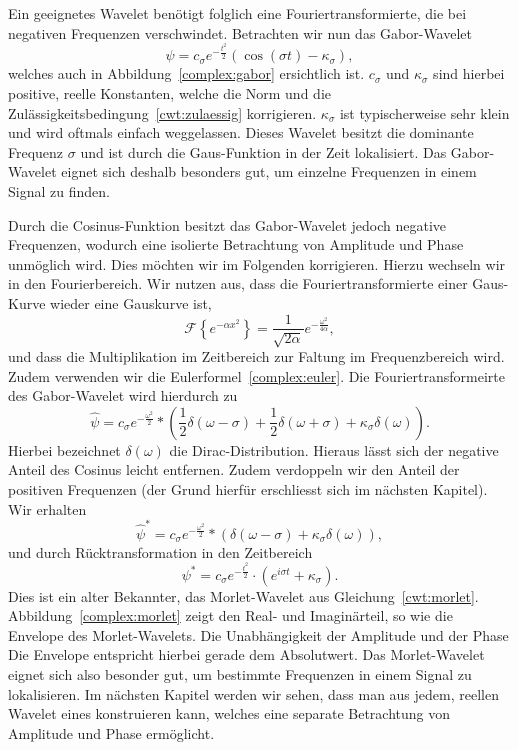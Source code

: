 Ein geeignetes Wavelet benötigt folglich eine Fouriertransformierte, die bei negativen Frequenzen verschwindet.
Betrachten wir nun das Gabor-Wavelet
\[
	\psi = c_\sigma e^{-\frac{t^2}{2}}\left(\cos\left(\sigma t\right) - \kappa_\sigma\right),
\]
welches auch in Abbildung~\ref{complex:gabor} ersichtlich ist.
$c_\sigma$ und $\kappa_\sigma$ sind hierbei positive, reelle Konstanten, welche die Norm und die Zulässigkeitsbedingung~\eqref{cwt:zulaessig} korrigieren.
$\kappa_\sigma$ ist typischerweise sehr klein und wird oftmals einfach weggelassen.
Dieses Wavelet besitzt die dominante Frequenz $\sigma$ und ist durch die Gaus-Funktion in der Zeit lokalisiert.
Das Gabor-Wavelet eignet sich deshalb besonders gut, um einzelne Frequenzen in einem Signal zu finden.

Durch die Cosinus-Funktion besitzt das Gabor-Wavelet jedoch negative Frequenzen, wodurch eine isolierte Betrachtung von Amplitude und Phase unmöglich wird.
Dies möchten wir im Folgenden korrigieren.
Hierzu wechseln wir in den Fourierbereich.
Wir nutzen aus, dass die Fouriertransformierte einer Gaus-Kurve wieder eine Gauskurve ist,
\[
	\mathcal{F}\left\lbrace e^{-\alpha x^2} \right\rbrace 
	= \frac{1}{\sqrt{2\alpha}}e^{- \frac{\omega^2}{4\alpha}},
\]
und dass die Multiplikation im Zeitbereich zur Faltung im Frequenzbereich wird.
Zudem verwenden wir die Eulerformel~\eqref{complex:euler}.
Die Fouriertransformeirte des Gabor-Wavelet wird hierdurch zu
\[
 \hat{\psi} = 
 c_\sigma e^{- \frac{\omega^2}{2}} * \left(
  \frac{1}{2}\delta(\omega - \sigma) +
  \frac{1}{2}\delta(\omega + \sigma) + 
  \kappa_\sigma\delta(\omega)
  \right).
\]
Hierbei bezeichnet $\delta(\omega)$ die Dirac-Distribution.
Hieraus lässt sich der negative Anteil des Cosinus leicht entfernen.
Zudem verdoppeln wir den Anteil der positiven Frequenzen (der Grund hierfür erschliesst sich im nächsten Kapitel).
Wir erhalten
\[
	\hat{\psi}^\ast = 
	c_\sigma e^{- \frac{\omega^2}{2}} * \left(
	\delta(\omega - \sigma) +
	\kappa_\sigma\delta(\omega)
	\right),
\]
und durch Rücktransformation in den Zeitbereich
\[
	\psi^\ast = 
	c_\sigma e^{- \frac{t^2}{2}} \cdot \left(
	e^{i\sigma t} +
	\kappa_\sigma
	\right).
\]
Dies ist ein alter Bekannter, das Morlet-Wavelet aus Gleichung~\eqref{cwt:morlet}.
Abbildung~\ref{complex:morlet} zeigt den Real- und Imaginärteil, so wie die Envelope des Morlet-Wavelets.
Die Unabhängigkeit der Amplitude und der Phase 
Die Envelope entspricht hierbei gerade dem Absolutwert.
Das Morlet-Wavelet eignet sich also besonder gut, um bestimmte Frequenzen in einem Signal zu lokalisieren.
Im nächsten Kapitel werden wir sehen, dass man aus jedem, reellen Wavelet eines konstruieren kann, welches eine separate Betrachtung von Amplitude und Phase ermöglicht.

